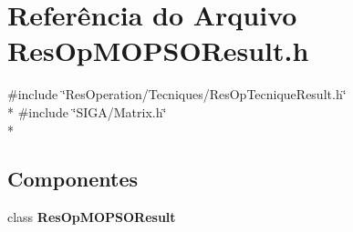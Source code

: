 \section{Referência do Arquivo Res\+Op\+M\+O\+P\+S\+O\+Result.\+h}
\label{_tecniques_2_m_o_p_s_o_2_res_op_m_o_p_s_o_result_8h}
{\ttfamily \#include \char`\"{}Res\+Operation/\+Tecniques/\+Res\+Op\+Tecnique\+Result.\+h\char`\"{}}\\*
{\ttfamily \#include \char`\"{}S\+I\+G\+A/\+Matrix.\+h\char`\"{}}\\*
\subsection*{Componentes}
\begin{DoxyCompactItemize}
\item 
class {\bf Res\+Op\+M\+O\+P\+S\+O\+Result}
\end{DoxyCompactItemize}
